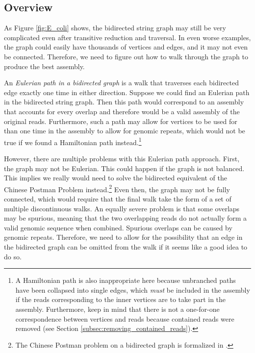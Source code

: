 \documentclass[10pt]{article}
\newcommand{\Figure}[1]{Figure \ref{#1}}
\newcommand{\Subsection}[1]{Section \ref{#1}}
\newcommand{\KeyTerm}[1]{{\it #1}}
\begin{document}
\label{sec:final}

\subsection{Overview}

As \Figure{fig:E_coli} shows, the bidirected string graph may still be very
complicated even after transitive reduction and traversal.  In even worse
examples, the graph could easily have thousands of vertices and edges, and it
may not even be connected.  Therefore, we need to figure out how to walk through
the graph to produce the best assembly.

An \KeyTerm{Eulerian path in a bidirected graph} is a walk that traverses each
bidirected edge exactly one time in either direction.  Suppose we could find an
Eulerian path in the bidirected string graph.  Then this path would correspond
to an assembly that accounts for every overlap and therefore would be a valid
assembly of the original reads.  Furthermore, such a path may allow for vertices
to be used for than one time in the assembly to allow for genomic repeats, which
would not be true if we found a Hamiltonian path instead.\footnote{A Hamiltonian
path is also inappropriate here because unbranched paths have been collapsed
into single edges, which {\em must} be included in the assembly if the reads
corresponding to the inner vertices are to take part in the assembly.
Furthermore, keep in mind that there is not a one-for-one correspondence between
vertices and reads because contained reads were removed (see
\Subsection{subsec:removing_contained_reads}).}

However, there are multiple problems with this Eulerian path approach.  First,
the graph may not be Eulerian.  This could happen if the graph is not balanced.
This implies we really would need to solve the bidirected equivalent of the
Chinese Postman Problem instead.\footnote{The Chinese Postman problem on a
bidirected graph is formalized in \cite{Medvedev2009}.}  Even then, the graph
may not be fully connected, which would require that the final walk take the
form of a set of multiple discontinuous walks.  An equally severe problem is
that some overlaps may be spurious, meaning that the two overlapping reads do
not actually form a valid genomic sequence when combined.  Spurious overlaps can
be caused by genomic repeats.  Therefore, we need to allow for the possibility
that an edge in the bidirected graph can be omitted from the walk if it seems
like a good idea to do so.
\end{document}
